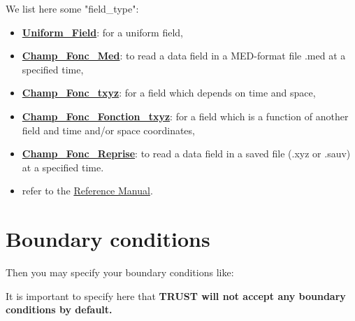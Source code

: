 We list here some "field\_type":
\begin{itemize}
\item \href{\REFERENCEMANUAL\#uniformfield}{\textbf{Uniform\_Field}}: for a uniform field,
\item \href{\REFERENCEMANUAL\#champfoncmed}{\textbf{Champ\_Fonc\_Med}}: to read a data field in a MED-format file .med at a specified time,
\item \href{\REFERENCEMANUAL\#fieldfunctxyz}{\textbf{Champ\_Fonc\_txyz}}: for a field which depends on time and space,
\item \href{\REFERENCEMANUAL\#champfoncfonctiontxyz}{\textbf{Champ\_Fonc\_Fonction\_txyz}}: for a field which is a function of another field and time and/or space coordinates,
\item \href{\REFERENCEMANUAL\#champfoncreprise}{\textbf{Champ\_Fonc\_Reprise}}: to read a data field in a saved file (.xyz or .sauv) at a specified time.
\item refer to the \href{\REFERENCEMANUAL\#fieldbase}{\trustref Reference Manual}.
\end{itemize}




\section{Boundary conditions}

Then you may specify your boundary conditions like:

    \begin{center}
    \end{center}

It is important to specify here that \textbf{TRUST will not accept any boundary conditions by default.}\\

